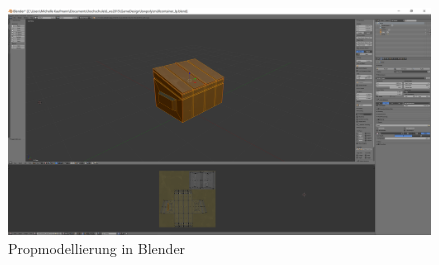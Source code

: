 \begin{figure}
	\centering
	\includegraphics[height=6cm]{images/screenshot1.png}
	\caption{Propmodellierung in Blender}
	\label{fig:containermodel}
\end{figure}